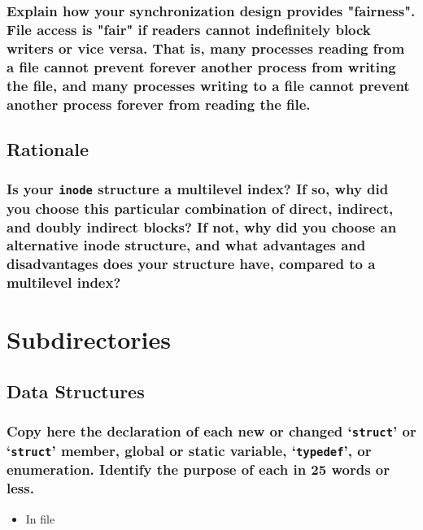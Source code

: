 \documentclass[sigconf, nonacm, balance=false, urlbreakonhyphens=true]{acmart}
\begin{document}
            \subsubsection{Explain how your synchronization design provides "fairness".  File access is "fair" if readers cannot indefinitely block writers or vice versa.  That is, many processes reading from a file cannot prevent forever another process from writing the file, and many processes writing to a file cannot prevent another process forever from reading the file. }
        
        \subsection{Rationale}
            
            \subsubsection{Is your \texttt{inode} structure a multilevel index?  If so, why did you choose this particular combination of direct, indirect, and doubly indirect blocks?  If not, why did you choose an alternative \texttt{}{inode} structure, and what advantages and disadvantages does your structure have, compared to a multilevel index? } 
    
    \section{Subdirectories}

        \label{Subdirectories}

        \subsection{Data Structures}
        
            \subsubsection{Copy here the declaration of each new or changed `\texttt{struct}' or `\texttt{struct}' member, global or static variable, `\texttt{typedef}', or enumeration. Identify the purpose of each in 25 words or less. }
    
                \begin{itemize}
                    \item In file \texttt{}
\begin{verbatim}
\end{verbatim}
                \end{itemize}
\end{document}
